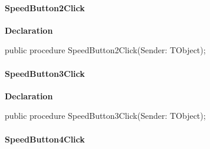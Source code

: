 \documentclass{report}
\newif\ifpdf
\begin{document}
\paragraph*{SpeedButton2Click}\hspace*{\fill}

\label{prjwizard.TfrmProjectWizard-SpeedButton2Click}
\begin{list}{}{
\setlength{\itemindent}{0cm}
\setlength{\listparindent}{0cm}
\setlength{\leftmargin}{\evensidemargin}
\addtolength{\leftmargin}{\tmplength}
\settowidth{\labelsep}{X}
\addtolength{\leftmargin}{\labelsep}
\setlength{\labelwidth}{\tmplength}
}
\item[\textbf{Declaration}\hfill]
\ifpdf
\begin{flushleft}
\fi
\begin{ttfamily}
public procedure SpeedButton2Click(Sender: TObject);\end{ttfamily}

\ifpdf
\end{flushleft}
\fi

\end{list}
\paragraph*{SpeedButton3Click}\hspace*{\fill}

\label{prjwizard.TfrmProjectWizard-SpeedButton3Click}
\begin{list}{}{
\setlength{\itemindent}{0cm}
\setlength{\listparindent}{0cm}
\setlength{\leftmargin}{\evensidemargin}
\addtolength{\leftmargin}{\tmplength}
\settowidth{\labelsep}{X}
\addtolength{\leftmargin}{\labelsep}
\setlength{\labelwidth}{\tmplength}
}
\item[\textbf{Declaration}\hfill]
\ifpdf
\begin{flushleft}
\fi
\begin{ttfamily}
public procedure SpeedButton3Click(Sender: TObject);\end{ttfamily}

\ifpdf
\end{flushleft}
\fi

\end{list}
\paragraph*{SpeedButton4Click}\hspace*{\fill}
\end{document}
